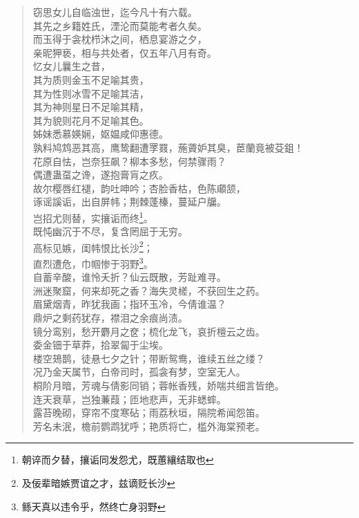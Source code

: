 \documentclass[12pt,oneside]{book}
\newenvironment{shici}{%
\begin{verse}%
\centering\large\hspace{12pt}}%
{\end{verse}}
\begin{document}
\begin{shici}
窃思女儿自临浊世，迄今凡十有六载。\\
其先之乡籍姓氏，湮沦而莫能考者久矣。\\
而玉得于衾枕栉沐之间，栖息宴游之夕，\\
亲昵狎亵，相与共处者，仅五年八月有奇。\\
忆女儿曩生之昔，\\
其为质则金玉不足喻其贵，\\
其为性则冰雪不足喻其洁，\\
其为神则星日不足喻其精，\\
其为貌则花月不足喻其色。\\
姊妹悉慕媖娴，妪媪咸仰惠德。\\
孰料鸠鸩恶其高，鹰鸷翻遭罦罬，葹薋妒其臭，茞蘭竟被芟鉏！\\
花原自怯，岂奈狂飙？柳本多愁，何禁骤雨？\\
偶遭蛊虿之谗，遂抱膏肓之疚。\\
故尔樱唇红褪，韵吐呻吟；杏脸香枯，色陈顑颔，\\
诼谣謑诟，出自屏帏；荆棘蓬榛，蔓延户牖。\\
岂招尤则替，实攘诟而终\footnote{朝谇而夕替，攘诟同发怨尤，既蕙纕结取也}。\\
既忳幽沉于不尽，复含罔屈于无穷。\\
高标见嫉，闺帏恨比长沙\footnote{及佞辈暗嫉贾谊之才，兹谪贬长沙}；\\
直烈遭危，巾帼惨于羽野\footnote{鲧天真以违令乎，然终亡身羽野}。\\
自蓄辛酸，谁怜夭折？仙云既散，芳趾难寻。\\
洲迷聚窟，何来却死之香？海失灵槎，不获回生之药。\\
眉黛烟青，昨犹我画；指环玉冷，今倩谁温？\\
鼎炉之剩药犹存，襟泪之余痕尚渍。\\
镜分鸾别，愁开麝月之奁；梳化龙飞，哀折檀云之齿。\\
委金钿于草莽，拾翠匐于尘埃。\\
楼空鳷鹊，徒悬七夕之针；带断鸳鸯，谁续五丝之缕？\\
况乃金天属节，白帝司时，孤衾有梦，空室无人。\\
桐阶月暗，芳魂与倩影同销；蓉帐香残，娇喘共细言皆绝。\\
连天衰草，岂独蒹葭；匝地悲声，无非蟋蟀。\\
露苔晚砌，穿帘不度寒砧；雨荔秋垣，隔院希闻怨笛。\\
芳名未泯，檐前鹦鹉犹呼；艳质将亡，槛外海棠预老。\\

\end{shici}
\end{document}
